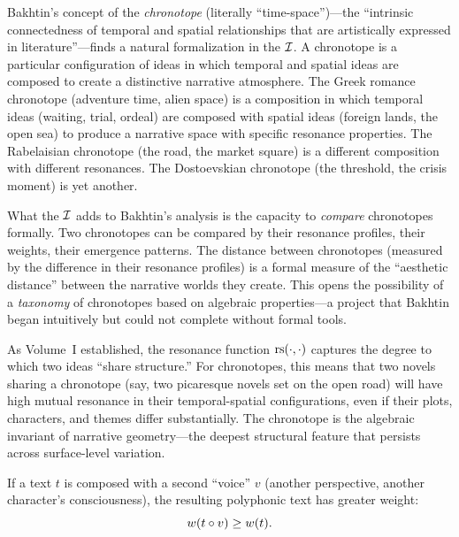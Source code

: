 \begin{interpretation}
\label{interp:chronotope-geometry}
Bakhtin's concept of the \emph{chronotope} (literally ``time-space'')---the ``intrinsic connectedness of temporal and spatial relationships that are artistically expressed in literature''---finds a natural formalization in the $\mathcal{I}$.  A chronotope is a particular configuration of ideas in which temporal and spatial ideas are composed to create a distinctive narrative atmosphere.  The Greek romance chronotope (adventure time, alien space) is a composition in which temporal ideas (waiting, trial, ordeal) are composed with spatial ideas (foreign lands, the open sea) to produce a narrative space with specific resonance properties.  The Rabelaisian chronotope (the road, the market square) is a different composition with different resonances.  The Dostoevskian chronotope (the threshold, the crisis moment) is yet another.

What the $\mathcal{I}$ adds to Bakhtin's analysis is the capacity to \emph{compare} chronotopes formally.  Two chronotopes can be compared by their resonance profiles, their weights, their emergence patterns.  The distance between chronotopes (measured by the difference in their resonance profiles) is a formal measure of the ``aesthetic distance'' between the narrative worlds they create.  This opens the possibility of a \emph{taxonomy} of chronotopes based on algebraic properties---a project that Bakhtin began intuitively but could not complete without formal tools.

As Volume~I established, the resonance function $\mathrm{rs}(\cdot, \cdot)$ captures the degree to which two ideas ``share structure.''  For chronotopes, this means that two novels sharing a chronotope (say, two picaresque novels set on the open road) will have high mutual resonance in their temporal-spatial configurations, even if their plots, characters, and themes differ substantially.  The chronotope is the algebraic invariant of narrative geometry---the deepest structural feature that persists across surface-level variation.
\end{interpretation}

\begin{theorem}
\label{thm:polyphonic-exceeds-mono}
If a text $t$ is composed with a second ``voice'' $v$ (another perspective, another character's consciousness), the resulting polyphonic text has greater weight:
\[
  w(t \circ v) \geq w(t).
\]
\end{theorem}

